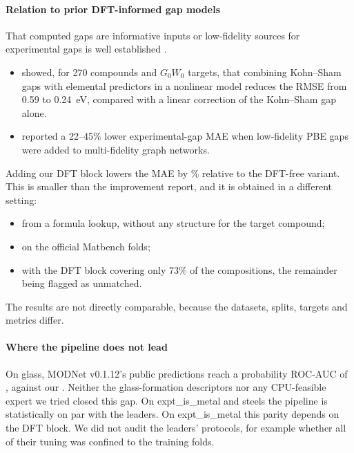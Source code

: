 \paragraph{Relation to prior DFT-informed gap models}
That computed gaps are informative inputs or low-fidelity sources for experimental gaps is well established \citep{lee2016gap,pilania2017mf,kauwe2020bandgap,chen2021multifidelity,liu2022denoise,ko2024gap}.
\begin{itemize}
\item \textbf{\citet{lee2016gap}} showed, for 270 compounds and $G_0W_0$ targets, that combining Kohn--Sham gaps with elemental predictors in a nonlinear model reduces the RMSE from 0.59 to 0.24~eV, compared with a linear correction of the Kohn--Sham gap alone.
\item \textbf{\citet{chen2021multifidelity}} reported a 22--45\% lower experimental-gap MAE when low-fidelity PBE gaps were added to multi-fidelity graph networks.
\end{itemize}
Adding our DFT block lowers the MAE by \AblNoDftGapGainRel\% relative to the DFT-free variant. This is smaller than the improvement \citet{chen2021multifidelity} report, and it is obtained in a different setting:
\begin{itemize}
\item from a formula lookup, without any structure for the target compound;
\item on the official Matbench folds;
\item with the DFT block covering only 73\% of the compositions, the remainder being flagged as unmatched.
\end{itemize}
The results are not directly comparable, because the datasets, splits, targets and metrics differ.

\paragraph{Where the pipeline does not lead}
On glass, MODNet v0.1.12's public predictions reach a probability ROC-AUC of \AtwoLeaderAUCGlass, against our \AtwoAUCGlass{}. Neither the glass-formation descriptors nor any CPU-feasible expert we tried closed this gap.
On expt\_is\_metal and steels the pipeline is statistically on par with the leaders. On expt\_is\_metal this parity depends on the DFT block.
We did not audit the leaders' protocols, for example whether all of their tuning was confined to the training folds.

